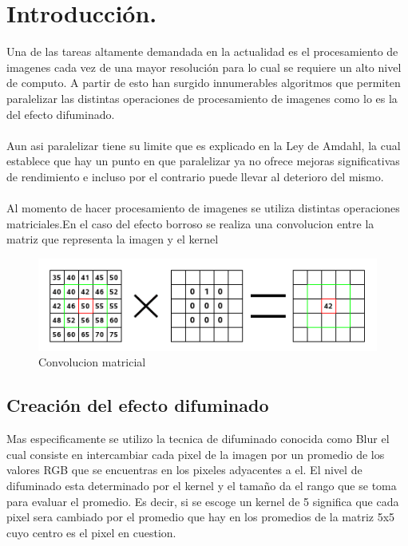 \documentclass{IEEEtran}
\begin{document}
\section{Introducción.}
Una de las tareas altamente demandada en la actualidad es el procesamiento de imagenes cada vez de una mayor resolución para lo cual se requiere un alto nivel de computo. A partir de esto han surgido innumerables algoritmos que permiten paralelizar las distintas operaciones de procesamiento de imagenes como lo es la del efecto difuminado.\\\\
Aun asi paralelizar tiene su limite que es explicado en la Ley de Amdahl, la cual establece que hay un punto en que paralelizar ya no ofrece mejoras significativas de rendimiento e incluso por el contrario puede llevar al deterioro del mismo.\\\\

Al momento de hacer procesamiento de imagenes se utiliza distintas operaciones matriciales.En el caso del efecto borroso se realiza una convolucion entre la matriz que representa la imagen y el kernel

\begin{figure}[H]
  \includegraphics[width=\linewidth]{matriz.png}
  \caption{Convolucion matricial}
  \label{fig:boat1}
\end{figure}
\subsection{Creación del efecto difuminado}

Mas especificamente se utilizo la tecnica de difuminado conocida como Blur el cual consiste en intercambiar cada pixel de la imagen por un promedio de los valores RGB que se encuentras en los pixeles adyacentes a el. El nivel de difuminado esta determinado por el kernel y el tamaño da el rango que se toma para evaluar el promedio. Es decir, si se escoge un kernel de 5 significa que cada pixel sera cambiado por el promedio que hay en los promedios de la matriz 5x5 cuyo centro es el pixel en cuestion.
\end{document}
